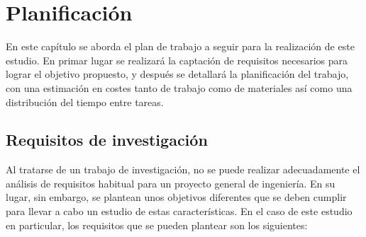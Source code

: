 \chapter{Planificación}

En este capítulo se aborda el plan de trabajo a seguir para la realización de este estudio. En primar lugar se realizará la captación de requisitos necesarios para lograr el objetivo propuesto, y después se detallará la planificación del trabajo, con una estimación en costes tanto de trabajo como de materiales así como una distribución del tiempo entre tareas.

\section{Requisitos de investigación}

Al tratarse de un trabajo de investigación, no se puede realizar adecuadamente el análisis de requisitos habitual para un proyecto general de ingeniería. En su lugar, sin embargo, se plantean unos objetivos diferentes que se deben cumplir para llevar a cabo un estudio de estas características. En el caso de este estudio en particular, los requisitos que se pueden plantear son los siguientes:

